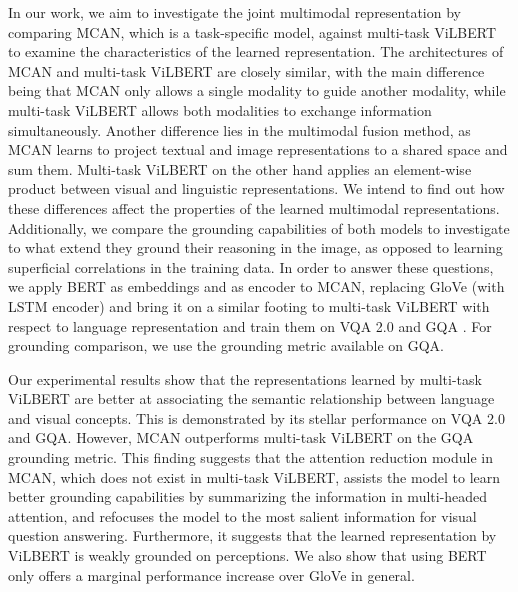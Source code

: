 \documentclass{article}
\begin{document}
In our work, we aim to investigate the joint multimodal representation by comparing MCAN, which is a task-specific model, against multi-task ViLBERT to examine the characteristics of the learned representation. The architectures of MCAN and multi-task ViLBERT are closely similar, with the main difference being that MCAN only allows a single modality to guide another modality, while multi-task ViLBERT allows both modalities to exchange information simultaneously. Another difference lies in the multimodal fusion method, as MCAN learns to project textual and image representations to a shared space and sum them. Multi-task ViLBERT on the other hand applies an element-wise product between visual and linguistic representations. We intend to find out how these differences affect the properties of the learned multimodal representations. Additionally, we compare the grounding capabilities of both models to investigate to what extend they ground their reasoning in the image, as opposed to learning superficial correlations in the training data. In order to answer these questions, we apply BERT as embeddings and as encoder to MCAN, replacing GloVe \citep{pennington2014glove} (with LSTM encoder) and bring it on a similar footing to multi-task ViLBERT with respect to language representation and train them on VQA 2.0 \citep{goyal2017vqa2} and GQA \citet{hudson2019gqa}. For grounding comparison, we use the grounding metric available on GQA.

Our experimental results show that the representations learned by multi-task ViLBERT are better at associating the semantic relationship between language and visual concepts. This is demonstrated by its stellar performance on VQA 2.0 and GQA.  However, MCAN outperforms multi-task ViLBERT on the GQA grounding metric. This finding suggests that the attention reduction module in MCAN, which does not exist in multi-task ViLBERT, assists the model to learn better grounding capabilities by summarizing the information in multi-headed attention, and refocuses the model to the most salient information for visual question answering. Furthermore, it suggests that the learned representation by ViLBERT is weakly grounded on perceptions. We also show that using BERT only offers a marginal performance increase over GloVe in general.
\end{document}
